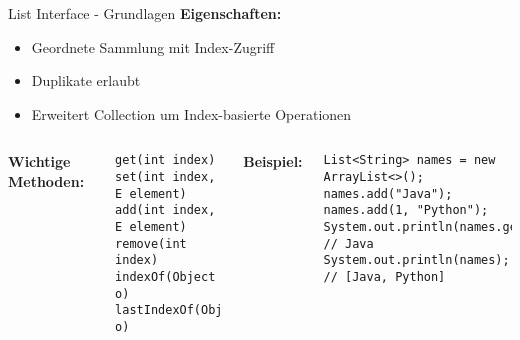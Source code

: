 \begin{frame}[fragile]{List Interface - Grundlagen}
  \textbf{Eigenschaften:}
  \begin{itemize}
    \item Geordnete Sammlung mit Index-Zugriff
    \item Duplikate erlaubt
    \item Erweitert Collection um Index-basierte Operationen
  \end{itemize}

  \begin{columns}[T]
    \textbf{Wichtige Methoden:}
    \begin{lstlisting}[style=java, basicstyle=\footnotesize\ttfamily]
get(int index)
set(int index, E element)
add(int index, E element)
remove(int index)
indexOf(Object o)
lastIndexOf(Object o)
    \end{lstlisting}

    \textbf{Beispiel:}
    \begin{lstlisting}[style=java, basicstyle=\footnotesize\ttfamily]
List<String> names = new ArrayList<>();
names.add("Java");
names.add(1, "Python");
System.out.println(names.get(0)); // Java
System.out.println(names); // [Java, Python]
    \end{lstlisting}
  \end{columns}
\end{frame}

